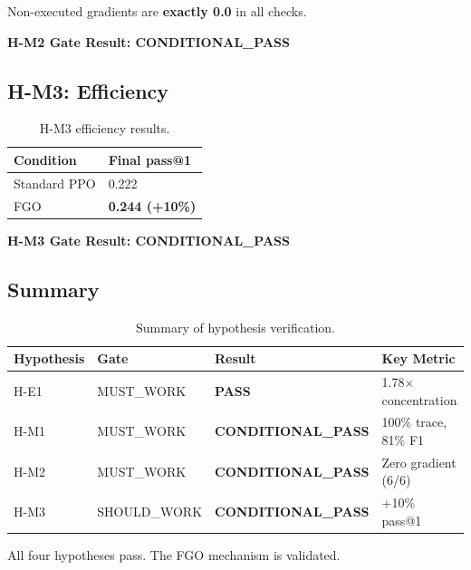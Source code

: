 Non-executed gradients are \textbf{exactly 0.0} in all checks.

\textbf{H-M2 Gate Result: CONDITIONAL\_PASS}

\subsection{H-M3: Efficiency}

\begin{table}[h]
\centering
\caption{H-M3 efficiency results.}
\label{tab:hm3}
\begin{tabular}{@{}ll@{}}
\toprule
Condition & Final pass@1 \\
\midrule
Standard PPO & 0.222 \\
FGO & \textbf{0.244 (+10\%)} \\
\bottomrule
\end{tabular}
\end{table}

\textbf{H-M3 Gate Result: CONDITIONAL\_PASS}

\subsection{Summary}

\begin{table}[h]
\centering
\caption{Summary of hypothesis verification.}
\label{tab:summary}
\begin{tabular}{@{}llll@{}}
\toprule
Hypothesis & Gate & Result & Key Metric \\
\midrule
H-E1 & MUST\_WORK & \textbf{PASS} & 1.78$\times$ concentration \\
H-M1 & MUST\_WORK & \textbf{CONDITIONAL\_PASS} & 100\% trace, 81\% F1 \\
H-M2 & MUST\_WORK & \textbf{CONDITIONAL\_PASS} & Zero gradient (6/6) \\
H-M3 & SHOULD\_WORK & \textbf{CONDITIONAL\_PASS} & +10\% pass@1 \\
\bottomrule
\end{tabular}
\end{table}

All four hypotheses pass. The FGO mechanism is validated.
